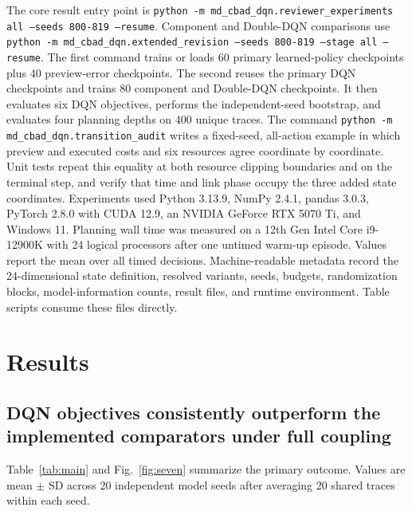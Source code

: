 \documentclass[11pt]{article}
\begin{document}
\color{red}%
The core result entry point is \texttt{python -m md\_cbad\_dqn.\allowbreak reviewer\_experiments all \allowbreak --seeds 800-819 \allowbreak --resume}. Component and Double-DQN comparisons use \texttt{python -m md\_cbad\_dqn.\allowbreak extended\_revision \allowbreak --seeds 800-819 \allowbreak --stage all \allowbreak --resume}. The first command trains or loads 60 primary learned-policy checkpoints plus 40 preview-error checkpoints. The second reuses the primary DQN checkpoints and trains 80 component and Double-DQN checkpoints. It then evaluates six DQN objectives, performs the independent-seed bootstrap, and evaluates four planning depths on 400 unique traces. The command \texttt{python -m md\_cbad\_dqn.\allowbreak transition\_audit} writes a fixed-seed, all-action example in which preview and executed costs and six resources agree coordinate by coordinate. Unit tests repeat this equality at both resource clipping boundaries and on the terminal step, and verify that time and link phase occupy the three added state coordinates. Experiments used Python 3.13.9, NumPy 2.4.1, pandas 3.0.3, PyTorch 2.8.0 with CUDA 12.9, an NVIDIA GeForce RTX 5070 Ti, and Windows 11. Planning wall time was measured on a 12th Gen Intel Core i9-12900K with 24 logical processors after one untimed warm-up episode. Values report the mean over all timed decisions. Machine-readable metadata record the 24-dimensional state definition, resolved variants, seeds, budgets, randomization blocks, model-information counts, result files, and runtime environment. Table scripts consume these files directly.
\color{black}%

\section{Results}
\label{sec:results}

\color{red}%
\subsection{DQN objectives consistently outperform the implemented comparators under full coupling}
\color{black}%

\color{red}%
Table~\ref{tab:main} and Fig.~\ref{fig:seven} summarize the primary outcome. Values are mean $\pm$ SD across 20 independent model seeds after averaging 20 shared traces within each seed.
\color{black}%
\end{document}
